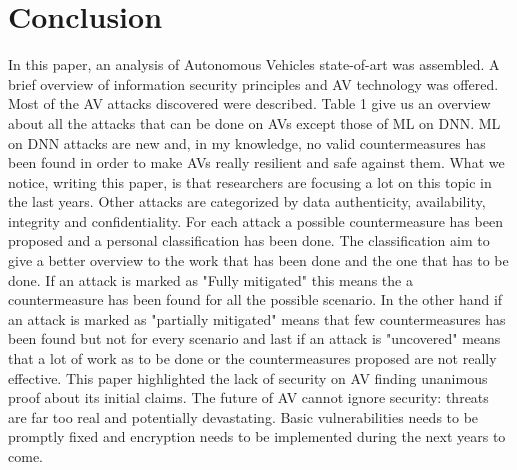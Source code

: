 \section{Conclusion}
    In this paper, an analysis of Autonomous Vehicles state-of-art was assembled. A brief overview of information security principles and AV technology was offered. Most of the AV attacks discovered were described. 
    \newline
    Table 1 give us an overview about all the attacks that can be done on AVs except those of ML on DNN. ML on DNN attacks are new and, in my knowledge, no valid countermeasures has been found in order to make AVs really resilient and safe against them. What we notice, writing this paper, is that researchers are focusing a lot on this topic in the last years.
    \newline
    Other attacks are categorized by data authenticity, availability, integrity and confidentiality. For each attack a possible countermeasure has been proposed and a personal classification has been done. The classification aim to give a better overview to the work that has been done and the one that has to be done. If an attack is marked as "Fully mitigated" this means the a countermeasure has been found for all the possible scenario. In the other hand if an attack is marked as "partially mitigated" means that few countermeasures has been found but not for every scenario and last if an attack is "uncovered" means that a lot of work as to be done or the countermeasures proposed are not really effective. 
    \newline
    This paper highlighted the lack of security on AV finding unanimous proof about its initial claims. The future of AV cannot ignore security: threats are far too real and potentially devastating. Basic vulnerabilities needs to be promptly fixed and encryption needs to be implemented during the next years to come. 


